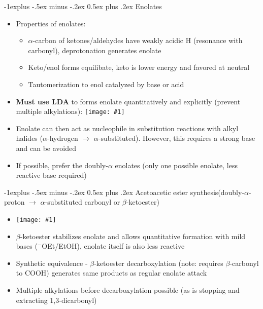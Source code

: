 \documentclass[10pt,landscape]{article}
\makeatletter
\renewcommand{\subsection}{\@startsection{subsection}{2}{0mm}%
  {-1explus -.5ex minus -.2ex}%
  {0.5ex plus .2ex}%
  {\normalfont\normalsize\bfseries}}
\newcommand{\img}[1]{\texttt{[image: \#1]}}
\makeatother
\begin{document}
\begin{multicols*}{3}
\begin{scriptsize}
    
    \subsection{Enolates}

    \begin{itemize}
    \item Properties of enolates:
      \begin{itemize}
      \item $\alpha$-carbon of ketones/aldehydes have weakly acidic H (resonance with
        carbonyl), deprotonation generates enolate
      \item Keto/enol forms equilibate, keto is lower energy and favored at neutral
      \item Tautomerization to enol catalyzed by base or acid
      \end{itemize}
    \item \textbf{Must use LDA} to forms enolate quantitatively and explicitly (prevent multiple alkylations):
      \img{enol1.png}
    \item Enolate can then act as nucleophile in substitution reactions with alkyl halides
      ($\alpha$-hydrogen $\rightarrow$ $\alpha$-substituted). However, this requires a strong
      base and can be avoided
    \item If possible, prefer the doubly-$\alpha$ enolates (only one
      possible enolate, less reactive base required)
    \end{itemize}
    
    \subsection{Acetoacetic ester synthesis(doubly-$\alpha$-proton $\rightarrow$
      $\alpha$-substituted carbonyl or $\beta$-ketoester)}

    \begin{itemize}
    \item[] \img{rcooet.png}
    \item $\beta$-ketoester stabilizes enolate and allows quantitative formation with mild
      bases ($^-$OEt/EtOH), enolate itself is also less reactive
    \item Synthetic equivalence - $\beta$-ketoester decarboxylation (note: requires
      $\beta$-carbonyl to COOH) generates same products as regular enolate attack 
    \item Multiple alkylations before decarboxylation possible (as is stopping and
      extracting 1,3-dicarbonyl)
    \end{itemize}


\end{scriptsize}
\end{multicols*}
\end{document}
